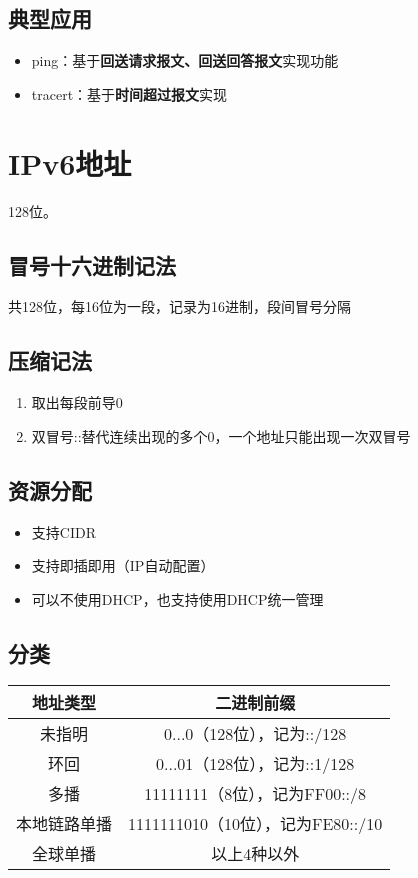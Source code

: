 \subsection{典型应用}
\begin{itemize}
    \item ping：基于\textbf{回送请求报文、回送回答报文}实现功能
    \item tracert：基于\textbf{时间超过报文}实现
\end{itemize}


\section{IPv6地址}
128位。

\subsection{冒号十六进制记法}
共128位，每16位为一段，记录为16进制，段间冒号分隔


\subsection{压缩记法}
\begin{enumerate}
    \item 取出每段前导0
    \item 双冒号::替代连续出现的多个0，一个地址只能出现一次双冒号
\end{enumerate}


\subsection{资源分配}
\begin{itemize}
    \item 支持CIDR
    \item 支持即插即用（IP自动配置）
    \item 可以不使用DHCP，也支持使用DHCP统一管理
\end{itemize}


\subsection{分类}
\begin{center}
    \begin{tabular}{c|c}
        \hline
        地址类型 & 二进制前缀 \\
        \hline
        未指明 & 0...0（128位），记为::/128 \\ 
        \hline
        环回 & 0...01（128位），记为::1/128 \\
        \hline
        多播 & 11111111（8位），记为FF00::/8 \\
        \hline
        本地链路单播 & 1111111010（10位），记为FE80::/10 \\
        \hline
        全球单播 & 以上4种以外 \\
        \hline
    \end{tabular}
\end{center}

